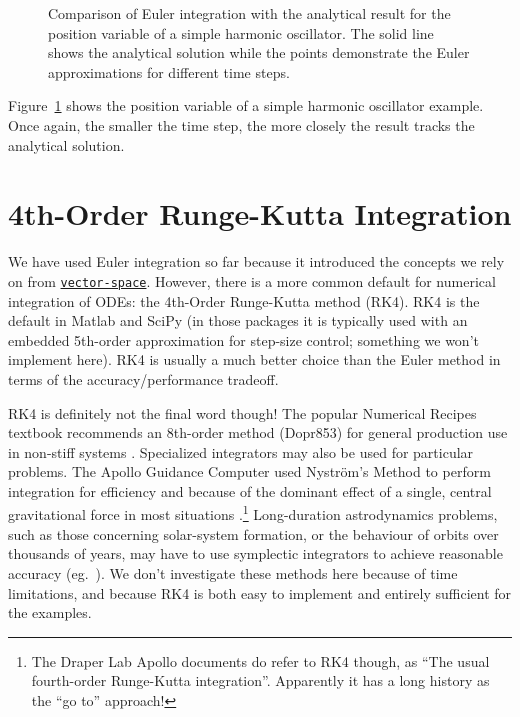 \documentclass[12pt,openany]{book}
\newcommand{\hspackage}[1]{\href{http://hackage.haskell.org/package/#1}{\texttt{#1}}}
\begin{document}
\begin{figure}[htbp]
  \resizebox{\textwidth}{!}{}
  \caption{Comparison of Euler integration with the analytical result for the position variable of a simple harmonic oscillator. The solid line shows the analytical solution while the points demonstrate the Euler approximations for different time steps.}
  \label{fig:euler-shm}
\end{figure}

Figure~\ref{fig:euler-shm} shows the position variable of a simple harmonic oscillator example. Once again, the smaller the time step, the more closely the result tracks the analytical solution.

\section{4th-Order Runge-Kutta Integration}

We have used Euler integration so far because it introduced the concepts we rely on from \hspackage{vector-space}. However, there is a more common default for numerical integration of ODEs: the 4th-Order Runge-Kutta method (RK4). RK4 is the default in Matlab and SciPy (in those packages it is typically used with an embedded 5th-order approximation for step-size control; something we won't implement here). RK4 is usually a much better choice than the Euler method in terms of the accuracy/performance tradeoff.

RK4 is definitely not the final word though! The popular Numerical Recipes textbook recommends an 8th-order method (Dopr853) for general production use in non-stiff systems \cite{press2007}. Specialized integrators may also be used for particular problems. The Apollo Guidance Computer used Nystr\"om's Method to perform integration for efficiency and because of the dominant effect of a single, central gravitational force in most situations \cite{levine1971}.\footnote{The Draper Lab Apollo documents do refer to RK4 though, as ``The usual fourth-order Runge-Kutta integration''. Apparently it has a long history as the ``go to'' approach!} Long-duration astrodynamics problems, such as those concerning solar-system formation, or the behaviour of orbits over thousands of years, may have to use symplectic integrators to achieve reasonable accuracy (eg.~\cite{rein2017}). We don't investigate these methods here because of time limitations, and because RK4 is both easy to implement and entirely sufficient for the examples.
\end{document}
